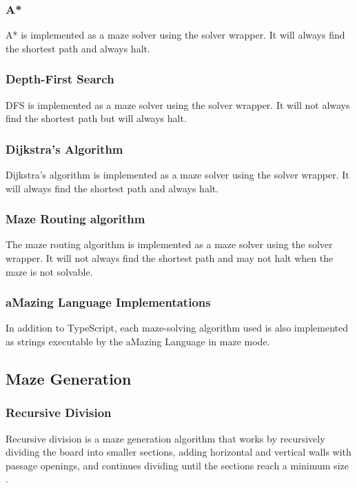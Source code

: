 \subsubsection{A*}

A* \cite{a-star-alg} is implemented as a maze solver using the solver wrapper. It will always find the shortest path and always halt.

\subsubsection{Depth-First Search}

DFS \cite{pkd} is implemented as a maze solver using the solver wrapper. It will not always find the shortest path but will always halt.

\subsubsection{Dijkstra's Algorithm}

Dijkstra's algorithm \cite{dijkstras-alg} is implemented as a maze solver using the solver wrapper. It will always find the shortest path and always halt.

\subsubsection{Maze Routing algorithm}

The maze routing algorithm \cite{maze-routing-alg} is implemented as a maze solver using the solver wrapper. It will not always find the shortest path and may not halt when the maze is not solvable.

\subsubsection{aMazing Language Implementations}

In addition to TypeScript, each maze-solving algorithm used is also implemented as strings executable by the aMazing Language in maze mode.

\subsection{Maze Generation}
\subsubsection{Recursive Division}
Recursive division is a maze generation algorithm that works by recursively dividing the board into smaller sections, adding horizontal and vertical walls with passage openings, and continues dividing until the sections reach a minimum size \cite{recursive-division-alg}.

